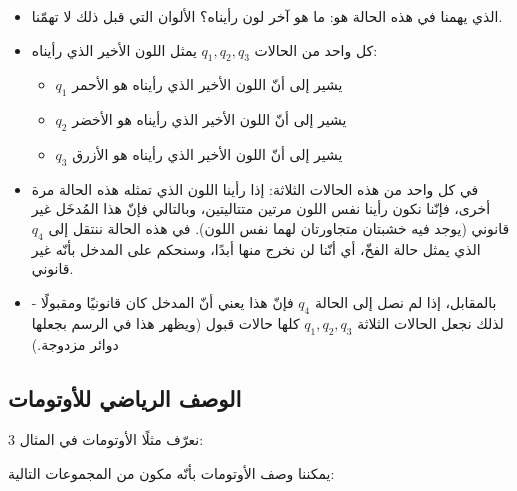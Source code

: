 \documentclass[12pt]{article}
\begin{document}
\begin{itemize}
    \item الذي يهمنا في هذه الحالة هو: ما هو آخر لون رأيناه؟ الألوان التي قبل ذلك لا تهمّنا.
    \item كل واحد من الحالات $q_1, q_2, q_3$ يمثل اللون الأخير الذي رأيناه:
    \begin{itemize}
        \item $q_1$ يشير إلى أنّ اللون الأخير الذي رأيناه هو الأحمر
        \item $q_2$ يشير إلى أنّ اللون الأخير الذي رأيناه هو الأخضر
        \item $q_3$ يشير إلى أنّ اللون الأخير الذي رأيناه هو الأزرق
    \end{itemize}
    \item في كل واحد من هذه الحالات الثلاثة: إذا رأينا اللون الذي تمثله هذه الحالة مرة أخرى، فإنّنا نكون رأينا نفس اللون مرتين متتاليتين، وبالتالي فإنّ هذا المُدخَل غير قانوني (يوجد فيه خشبتان متجاورتان لهما نفس اللون).
    في هذه الحالة ننتقل إلى $q_4$ الذي يمثل حالة الفخّ، أي أنّنا لن نخرج منها أبدًا، وسنحكم على المدخل بأنّه غير قانوني.
    \item بالمقابل، إذا لم نصل إلى الحالة $q_4$ فإنّ هذا يعني أنّ المدخل كان قانونيًا ومقبولًا - لذلك نجعل الحالات الثلاثة $q_1, q_2, q_3$ كلها حالات قبول (ويظهر هذا في الرسم بجعلها دوائر مزدوجة.)
\end{itemize}


\subsection{الوصف الرياضي للأوتومات}

نعرّف مثلًا الأوتومات في المثال 3:

يمكننا وصف الأوتومات بأنّه مكون من المجموعات التالية:
\end{document}
